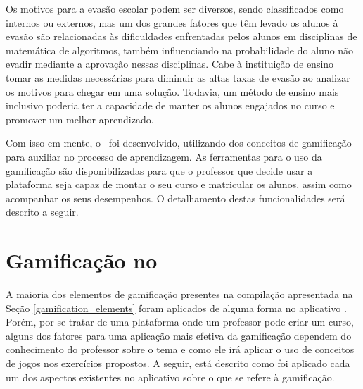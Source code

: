 Os motivos para a evasão escolar podem ser diversos, sendo classificados como internos ou externos, mas um dos grandes fatores que têm levado os alunos à evasão \cite{evasao-unb} são relacionadas às dificuldades enfrentadas pelos alunos em disciplinas de matemática de algoritmos, também influenciando na probabilidade do aluno não evadir mediante a aprovação nessas disciplinas. Cabe à instituição de ensino tomar as medidas necessárias para diminuir as altas taxas de evasão ao analizar os motivos para chegar em uma solução. Todavia, um método de ensino mais inclusivo poderia ter a capacidade de manter os alunos engajados no curso e promover um melhor aprendizado.

Com isso em mente, o \appName\ foi desenvolvido, utilizando dos conceitos de gamificação para auxiliar no processo de aprendizagem. As ferramentas para o uso da gamificação são disponibilizadas para que o professor que decide usar a plataforma seja capaz de montar o seu curso e matricular os alunos, assim como acompanhar os seus desempenhos. O detalhamento destas funcionalidades será descrito a seguir.

\section{Gamificação no \appName}

A maioria dos elementos de gamificação presentes na compilação apresentada na Seção \ref{gamification_elements} foram aplicados de alguma forma no aplicativo \appName. Porém, por se tratar de uma plataforma onde um professor pode criar um curso, alguns dos fatores para uma aplicação mais efetiva da gamificação dependem do conhecimento do professor sobre o tema e como ele irá aplicar o uso de conceitos de jogos nos exercícios propostos. A seguir, está descrito como foi aplicado cada um dos aspectos existentes no aplicativo sobre o que se refere à gamificação.

